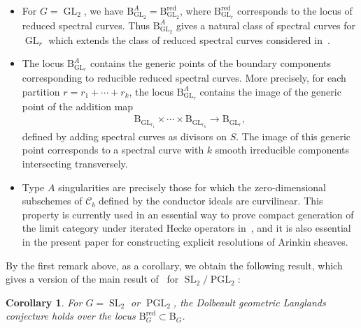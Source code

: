 \documentclass[11pt,oneside,a4paper,mathscr]{amsart}
\newtheorem{cor}[thm]{Corollary}
\theoremstyle{definition}
\newcommand{\cC}{\mathcal{C}}
\newcommand{\rB}{\mathrm{B}}
\newcommand{\GL}{\operatorname{GL}}
\newcommand{\SL}{\operatorname{SL}}
\newcommand{\PGL}{\operatorname{PGL}}
\begin{document}
\begin{itemize}[leftmargin=1.5em]
\item For $G=\GL_2$, we have $\rB_{\GL_2}^A=\rB_{\GL_2}^{\mathrm{red}}$, 
where $\rB_{\GL_r}^{\mathrm{red}}$ corresponds to the locus of reduced spectral curves. Thus $\rB_{\GL_2}^A$ gives 
    a natural class of spectral curves for $\GL_r$ which extends the class of 
    reduced spectral curves considered in~\cite{TodaGL2}.

    \item The locus $\rB_{\GL_r}^A$ contains the generic points of the boundary 
    components corresponding to reducible reduced spectral curves. More precisely, 
    for each partition $r=r_1+\cdots+r_k$, the locus $\rB_{\GL_r}^A$ contains the image 
    of the generic point of the addition map
    \begin{align*}
        \rB_{\GL_{r_1}}\times \cdots \times \rB_{\GL_{r_k}} \to \rB_{\GL_r},
    \end{align*}
    defined by adding spectral curves as divisors on $S$. The image of this 
    generic point corresponds to a spectral curve with $k$ smooth irreducible 
    components intersecting transversely. 

      \item Type $A$ singularities are precisely those for which the 
    zero-dimensional subschemes of $\cC_b$ defined by the conductor ideals are 
    curvilinear. This property is currently used in an essential way to prove 
    compact generation of the limit category under iterated Hecke operators 
    in~\cite{TodaGL2}, and it is also essential in the present paper for 
    constructing explicit resolutions of Arinkin sheaves. 
\end{itemize}




By the first remark above, as a corollary, we obtain 
the following result, which gives a version of the main result of~\cite[Theorem~1.2]{TodaGL2} for $\SL_2/\PGL_2$:
\begin{cor}\label{cor:SL2}
For $G=\SL_2$ or $\PGL_2$, the Dolbeault geometric Langlands conjecture holds over the locus $\rB_G^{\mathrm{red}} \subset \rB_G$.
\end{cor}
\end{document}
